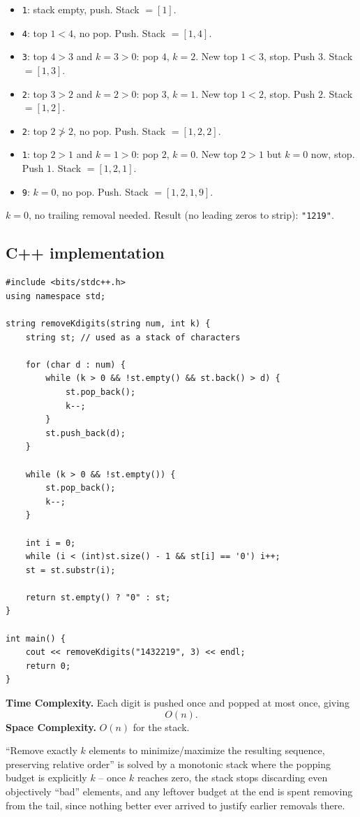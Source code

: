 \begin{itemize}
  \item \texttt{1}: stack empty, push. Stack $=[1]$.
  \item \texttt{4}: top $1<4$, no pop. Push. Stack $=[1,4]$.
  \item \texttt{3}: top $4>3$ and $k=3>0$: pop $4$, $k=2$. New top
        $1<3$, stop. Push $3$. Stack $=[1,3]$.
  \item \texttt{2}: top $3>2$ and $k=2>0$: pop $3$, $k=1$. New top
        $1<2$, stop. Push $2$. Stack $=[1,2]$.
  \item \texttt{2}: top $2 \not> 2$, no pop. Push. Stack $=[1,2,2]$.
  \item \texttt{1}: top $2>1$ and $k=1>0$: pop $2$, $k=0$. New top
        $2>1$ but $k=0$ now, stop. Push $1$. Stack $=[1,2,1]$.
  \item \texttt{9}: $k=0$, no pop. Push. Stack $=[1,2,1,9]$.
\end{itemize}

$k=0$, no trailing removal needed. Result (no leading zeros to strip):
\texttt{"1219"}.

\subsection*{C++ implementation}

\begin{lstlisting}
#include <bits/stdc++.h>
using namespace std;

string removeKdigits(string num, int k) {
    string st; // used as a stack of characters

    for (char d : num) {
        while (k > 0 && !st.empty() && st.back() > d) {
            st.pop_back();
            k--;
        }
        st.push_back(d);
    }

    while (k > 0 && !st.empty()) {
        st.pop_back();
        k--;
    }

    int i = 0;
    while (i < (int)st.size() - 1 && st[i] == '0') i++;
    st = st.substr(i);

    return st.empty() ? "0" : st;
}

int main() {
    cout << removeKdigits("1432219", 3) << endl;
    return 0;
}
\end{lstlisting}

\begin{complexitybox}
\textbf{Time Complexity.} Each digit is pushed once and popped at most
once, giving
\[
  O(n).
\]
\textbf{Space Complexity.} $O(n)$ for the stack.
\end{complexitybox}

\begin{takeawaybox}
``Remove exactly $k$ elements to minimize/maximize the resulting
sequence, preserving relative order'' is solved by a monotonic stack
where the popping budget is explicitly $k$ -- once $k$ reaches zero, the
stack stops discarding even objectively ``bad'' elements, and any
leftover budget at the end is spent removing from the tail, since nothing
better ever arrived to justify earlier removals there.
\end{takeawaybox}
